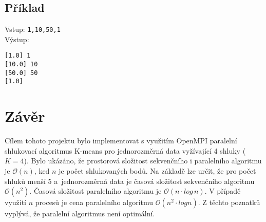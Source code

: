 \documentclass[a4paper, 11pt, fleqn]{scrartcl}
\begin{document}
    \subsection*{Příklad}
      Vstup: \texttt{1,10,50,1}\\
      Výstup:
      \begin{adjustwidth}{1em}{}
        \texttt{[1.0] 1}\\
        \texttt{[10.0] 10}\\
        \texttt{[50.0] 50}\\
        \texttt{[1.0]}
      \end{adjustwidth}

  \section{Závěr}
    Cílem tohoto projektu bylo implementovat s využitím OpenMPI paralelní shlukovací algoritmus K-means pro jednorozměrná data vyžívající 4 shluky ($K = 4$). Bylo ukázáno, že prostorová složitost sekvenčního i paralelního algoritmu je $\mathcal{O}(n)$, ked $n$ je počet shlukovaných bodů. Na základě \cite{fast} lze určit, že pro počet shluků menší 5 a~jednorozměrná data je časová složitost sekvenčního algoritmu $\mathcal{O}(n^2)$. Časová složitost paralelního algoritmu je $\mathcal{O}(n\cdot log\, n)$. V případě využití $n$ procesů je cena paralelního algoritmu $\mathcal{O}(n^2\cdot log n)$. Z těchto poznatků vyplývá, že paralelní algoritmus není optimální.

\end{document}
